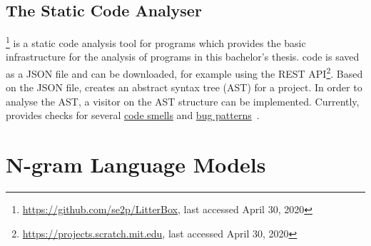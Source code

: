 \subsection{The Static \scratch{} Code Analyser \litterbox}\label{subsec:litterbox}
\litterbox{}\footnote{\url{https://github.com/se2p/LitterBox}, last accessed April 30, 2020} is a static code analysis tool for \scratch{} programs which provides the basic infrastructure for the analysis of \scratch{} programs in this bachelor's thesis. \scratch{} code is saved as a JSON file and can be downloaded, for example using the \scratch{} REST API\footnote{\url{https://projects.scratch.mit.edu}, last accessed April 30, 2020}. Based on the JSON file, \litterbox{} creates an abstract syntax tree (AST) for a \scratch{} project. In order to analyse the AST, a visitor on the AST structure can be implemented. Currently, \litterbox{} provides checks for several \hyperref[def:code-smells]{code smells} and \hyperref[def:bug-pattern]{bug patterns}~\cite{scratch_bugpatterns}.


\section{N-gram Language Models}\label{sec:language-models}



